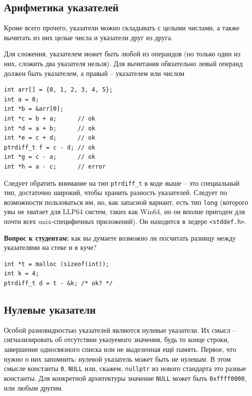 \documentclass[a4paper,12pt,oneside]{book}
\newif\ifanswers
\begin{document}
\subsection{Арифметика указателей}

Кроме всего прочего, указатели можно складывать с целыми числами, а также вычитать из них целые числа и указатели друг из друга.

Для сложения, указателем может быть любой из операндов (но только один из них, сложить два указателя нельзя). Для вычитания обязательно левый операнд должен быть указателем, а правый -- указателем или числом

\begin{lstlisting}
int arr[] = {0, 1, 2, 3, 4, 5};
int a = 0; 
int *b = &arr[0];
int *c = b + a;      // ok
int *d = a + b;      // ok
int *e = c + d;      // ok
ptrdiff_t f = c - d; // ok
int *g = c - a;      // ok
int *h = a - c;      // error
\end{lstlisting}

Следует обратить внимание на тип \lstinline!ptrdiff_t! в коде выше -- это специальный тип, достаточно широкий, чтобы хранить разность указателей. Следует по возможности пользоваться им, но, как запасной вариант, есть тип \lstinline!long! (которого увы не хватает для LLP64 систем, таких как Win64, но он вполне пригоден для почти всех unix-специфичных приложений). Он находится в хедере \lstinline!<stddef.h>!.

\textbf{Вопрос к студентам:} как вы думаете возможно ли посчитать разницу между указателями на стеке и в куче?

\begin{lstlisting}
int *t = malloc (sizeof(int));
int k = 4;
ptrdiff_t d = t - &k; /* ok? */
\end{lstlisting}

\ifanswers
Правильный ответ: разумеется да, адресная арифметика по стандарту прозрачна относительно того где расположена память до тех пор, пока все влезает в \lstinline!ptrdiff_t!.
\fi

\subsection{Нулевые указатели}\label{NullPointers}

Особой разновидностью указателей являются нулевые указатели. Их смысл -- сигнализировать об отсутствии указуемого значения, будь то конце строки, завершение односвязного списка или не выделенная ещё память. Первое, что нужно о них запомнить: нулевой указатель может быть не нулевым. В этом смысле константы \lstinline!0!, \lstinline!NULL! или, скажем, \lstinline!nullptr! из нового стандарта это разные константы. Для конкретной архитектуры значение \lstinline!NULL! может быть \lstinline!0xffff0000!, или любым другим.
\end{document}
